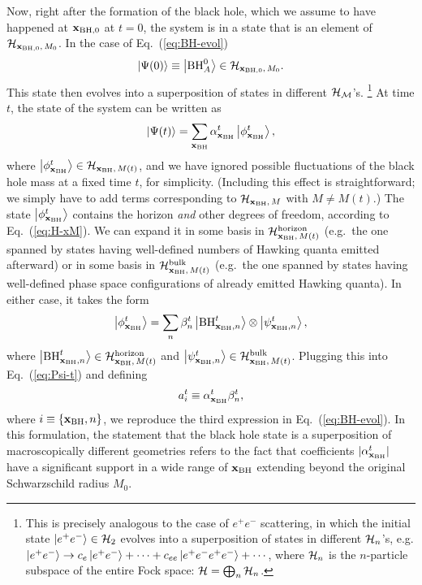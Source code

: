 \documentclass[12pt]{article}
\begin{document}
Now, right after the formation of the black hole, which we assume to 
have happened at ${\bf x}_{{\rm BH},0}$ at $t=0$, the system is in a state 
that is an element of ${\cal H}_{{\bf x}_{{\rm BH},0},\, M_0}$.  In the 
case of Eq.~(\ref{eq:BH-evol})
%
\begin{equation}
  \ket{\Psi(0)} \equiv \ket{{\rm BH}^0_A} 
    \in {\cal H}_{{\bf x}_{{\rm BH},0},\, M_0}.
\label{eq:Psi-0}
\end{equation}
%
This state then evolves into a superposition of states in different 
${\cal H}_{\cal M}$'s.%
\footnote{This is precisely analogous to the case of $e^+e^-$ scattering, 
 in which the initial state $\ket{e^+e^-} \in {\cal H}_2$ evolves into 
 a superposition of states in different ${\cal H}_n$'s, e.g. $\left| e^+e^- \right> 
 \rightarrow c_e \left| e^+e^- \right> + \cdots + c_{ee} \left| e^+e^-e^+e^- \right> + 
 \cdots$, where ${\cal H}_n$ is the $n$-particle subspace of the entire 
 Fock space: ${\cal H} = \bigoplus_n {\cal H}_n$.}
At time $t$, the state of the system can be written as
%
\begin{equation}
  \ket{\Psi(t)} = \sum_{{\bf x}_{\rm BH}} \alpha^t_{{\bf x}_{\rm BH}} 
    \ket{\phi^t_{{\bf x}_{\rm BH}}},
\label{eq:Psi-t}
\end{equation}
%
where $\ket{\phi^t_{{\bf x}_{\rm BH}}} \in {\cal H}_{{\bf x}_{\rm BH},\, 
M(t)}$, and we have ignored possible fluctuations of the black hole 
mass at a fixed time $t$, for simplicity. (Including this effect 
is straightforward; we simply have to add terms corresponding to 
${\cal H}_{{\bf x}_{\rm BH},\, M}$ with $M \neq M(t)$.)  The state 
$\left| \phi^t_{{\bf x}_{\rm BH}} \right>$ contains the horizon {\it and} other 
degrees of freedom, according to Eq.~(\ref{eq:H-xM}).  We can expand 
it in some basis in ${\cal H}_{{\bf x}_{\rm BH},\, M(t)}^{\rm horizon}$ 
(e.g.\ the one spanned by states having well-defined numbers of Hawking 
quanta emitted afterward) or in some basis in ${\cal H}_{{\bf x}_{\rm 
BH},\, M(t)}^{\rm bulk}$ (e.g.\ the one spanned by states having 
well-defined phase space configurations of already emitted Hawking 
quanta).  In either case, it takes the form
%
\begin{equation}
  \ket{\phi^t_{{\bf x}_{\rm BH}}} = \sum_n \beta^t_n 
    \ket{{\rm BH}^t_{{\bf x}_{\rm BH},n}} \otimes 
    \ket{\psi^t_{{\bf x}_{\rm BH},n}},
\label{eq:phi}
\end{equation}
%
where $\ket{{\rm BH}^t_{{\bf x}_{\rm BH},n}} \in {\cal H}_{{\bf x}_{\rm 
BH},\, M(t)}^{\rm horizon}$ and $\ket{\psi^t_{{\bf x}_{\rm BH},n}} \in 
{\cal H}_{{\bf x}_{\rm BH},\, M(t)}^{\rm bulk}$.  Plugging this into 
Eq.~(\ref{eq:Psi-t}) and defining
%
\begin{equation}
  a^t_i \equiv \alpha^t_{{\bf x}_{\rm BH}} \beta^t_n,
\label{eq:ati}
\end{equation}
%
where $i \equiv \{ {\bf x}_{\rm BH}, n \}$, we reproduce the third 
expression in Eq.~(\ref{eq:BH-evol}).  In this formulation, the statement 
that the black hole state is a superposition of macroscopically different 
geometries refers to the fact that coefficients $|\alpha^t_{{\bf x}_{\rm 
BH}}|$ have a significant support in a wide range of ${\bf x}_{\rm BH}$ 
extending beyond the original Schwarzschild radius $M_0$.
\end{document}
